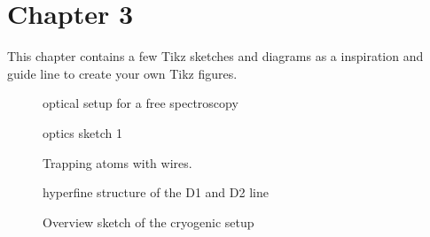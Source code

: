 \chapter{Chapter 3}\label{chap:chapter_3}
This chapter contains a few Tikz sketches and diagrams as a inspiration and guide line to create your own Tikz figures.

\begin{figure}[H]
	\centering
	\resizebox{\textwidth}{!}{
		\begin{tikzpicture}[use optics, scale=1.0]
			
		\end{tikzpicture}
	}
	\caption[DFS setup]{optical setup for a  free spectroscopy}
	\label{fig:dfs}
\end{figure}

\begin{figure}[H]
	\centering
	\begin{tikzpicture}[use optics, scale=0.7]
		
	\end{tikzpicture}
	\caption[optics sketch 1]{optics sketch 1}
	\label{fig:reflective_imaging_setup}
\end{figure}

\begin{figure}[H]
	\centering
	\begin{tikzpicture}[use optics, scale=0.7]
		
	\end{tikzpicture}
	\caption[trapping atoms wiht a wire]{Trapping atoms with wires.}
	\label{fig:trapping_atoms_with_a_wire}
\end{figure}

\begin{figure}[H]
	\centering	
	\begin{tikzpicture}[scale=0.55]
		
	\end{tikzpicture}
	\caption[\Rb D1,D2 line]{\Rb hyperfine structure of the D1 and D2 line}
	\label{fig:Rb_hyperfine_structure}
\end{figure}

\begin{figure}[H]
	\centering
	\begin{tikzpicture}[scale=0.48]
		
	\end{tikzpicture}
	\caption[overview of cryogenic setup]{Overview sketch of the cryogenic setup}
	\label{fig:cryogenic_overview}
\end{figure}

